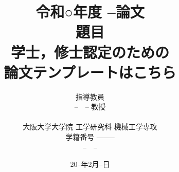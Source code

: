 
\title{ 
\vspace*{-3cm}
{\Large 令和○年度 --論文} 
\vspace{1cm} \\
 {\Large 題目} \\
{\LARGE \textbf{学士，修士認定のための\protect\\論文テンプレートはこちら}}\\ 
\vspace{3cm}
 }
%
\author{
指導教員 \vspace{0.1cm} \\
{\Large --　-- 教授} \\
\vspace{1cm}\\  
{\Large 大阪大学大学院 工学研究科 機械工学専攻}\\
  {\Large 学籍番号 --------} 
  \vspace{0.5cm} \\
  {\LARGE --　--}
\vspace{2.5cm}
}
%
\date{
{\Large 20--年2月--日}
}

\maketitle
